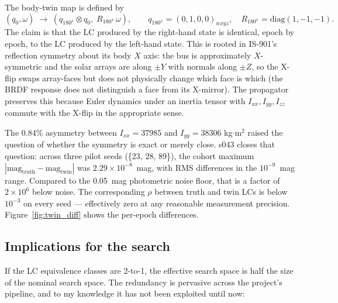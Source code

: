 \documentclass[11pt,a4paper]{article}
\begin{document}
The body-twin map is defined by
\begin{equation}
(q_0, \omega) \;\longrightarrow\; (q_{180^x} \otimes q_0,\; R_{180^x}\, \omega), \qquad
q_{180^x} = (0,1,0,0)_{wxyz}, \quad R_{180^x} = \mathrm{diag}(1, -1, -1).
\end{equation}
The claim is that the LC produced by the right-hand state is identical, epoch by epoch, to the LC produced by the left-hand state. This is rooted in IS-901's reflection symmetry about its body $X$ axis: the bus is approximately $X$-symmetric and the solar arrays are along $\pm Y$ with normals along $\pm Z$, so the X-flip swaps array-faces but does not physically change which face is which (the BRDF response does not distinguish a face from its X-mirror). The propagator preserves this because Euler dynamics under an inertia tensor with $I_{xx}, I_{yy}, I_{zz}$ commute with the X-flip in the appropriate sense.

The 0.84\% asymmetry between $I_{xx}{=}37985$ and $I_{yy}{=}38306$ kg$\cdot$m$^2$ raised the question of whether the symmetry is exact or merely close. s043 closes that question: across three pilot seeds (\{23, 28, 89\}), the cohort maximum $|\mathrm{mag}_{\mathrm{truth}} - \mathrm{mag}_{\mathrm{twin}}|$ was $2.29 \times 10^{-8}$~mag, with RMS differences in the $10^{-9}$~mag range. Compared to the 0.05~mag photometric noise floor, that is a factor of $2 \times 10^6$ below noise. The corresponding $\rho$ between truth and twin LCs is below $10^{-3}$ on every seed --- effectively zero at any reasonable measurement precision. Figure~\ref{fig:twin_diff} shows the per-epoch differences.

\subsection{Implications for the search}

If the LC equivalence classes are 2-to-1, the effective search space is half the size of the nominal search space. The redundancy is pervasive across the project's pipeline, and to my knowledge it has not been exploited until now:
\end{document}
